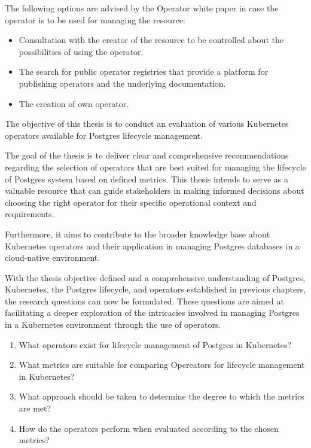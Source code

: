 The following options are advised by the Operator white paper \cite{operatorWhitepaper} in case the operator is to be used for managing the resource:
\begin{itemize}
    \item	Consultation with the creator of the resource to be controlled about the possibilities of using the operator.
    \item	The search for public operator registries that provide a platform for publishing operators and the underlying documentation.
    \item	The creation of own operator.
\end{itemize}

\label{chap:objectives}
The objective of this thesis is to conduct an evaluation of various Kubernetes operators available for Postgres lifecycle management.

The goal of the thesis is to deliver clear and comprehensive recommendations regarding the selection of operators that are best suited for managing the lifecycle of Postgres system based on defined metrics. This thesis intends to serve as a valuable resource that can guide stakeholders in making informed decisions about choosing the right operator for their specific operational context and requirements.

Furthermore, it aims to contribute to the broader knowledge base about Kubernetes operators and their application in managing Postgres databases in a cloud-native environment.


\label{chap:resourceQuestions}
With the thesis objective defined and a comprehensive understanding of Postgres, Kubernetes, the Postgres lifecycle, and operators established in previous chapters, the research questions can now be formulated.
These questions are aimed at facilitating a deeper exploration of the intricacies involved in managing Postgres in a Kubernetes environment through the use of operators.

\begin{enumerate}
    \item What operators exist for lifecycle management of Postgres in Kubernetes?
    \item What metrics are suitable for comparing Opereators for lifecycle management in Kubernetes?
    \item What approach should be taken to determine the degree to which the metrics are met?
    \item How do the operators perform when evaluated according to the chosen metrics?
\end{enumerate}

